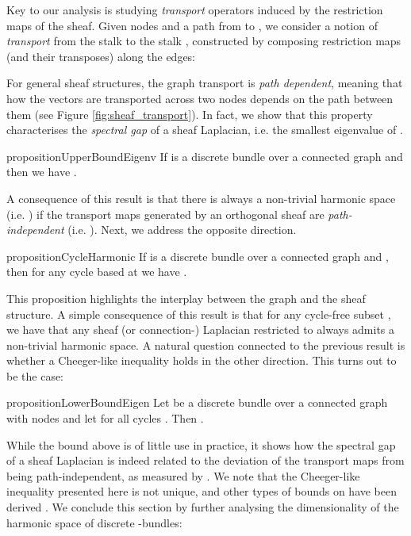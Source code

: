 \documentclass{article}
\begin{document}
Key to our analysis is studying \emph{transport} operators induced by the restriction maps of the sheaf. Given nodes  and a path  from  to , we consider a notion of \emph{transport} from the stalk  to the stalk , 
constructed by composing restriction maps (and their transposes) along the edges: \vspace{-1mm}

For general sheaf structures, the graph transport is \emph{path dependent}, meaning that how the vectors are transported across two nodes depends on the path between them (see Figure \ref{fig:sheaf_transport}). In fact, we show that this property characterises the {\em spectral gap} of a sheaf Laplacian, i.e. the smallest eigenvalue of . 
\begin{restatable}{proposition}{UpperBoundEigenv}\label{prop:upper_bound_eigenv} If  is a discrete  bundle over a connected graph and  then we have 
.
\end{restatable}
A consequence of this result is that there is always a non-trivial harmonic space (i.e. ) if the transport maps generated by an orthogonal sheaf are \emph{path-independent} (i.e. ). Next, we address the opposite direction.\begin{restatable}{proposition}{CycleHarmonic}\label{prop:cycle_harmonic}
If  is a discrete  bundle over a connected graph and , then for any cycle  based at  we have 
.
\end{restatable}


This proposition highlights the interplay between the graph and the sheaf structure. A simple consequence of this result is that for any cycle-free subset , we have that any sheaf (or connection-) Laplacian restricted to  always admits a non-trivial harmonic space. A natural question connected to the previous result is whether a Cheeger-like inequality holds in the other direction. This turns out to be the case:

\begin{restatable}{proposition}{LowerBoundEigen}\label{prop:lower_bound_eigen}
Let  be a discrete  bundle over a connected graph  with  nodes and let  for all cycles . Then 
.
\end{restatable}
While the bound above is of little use in practice, it shows how the spectral gap of a sheaf Laplacian is indeed related to the deviation of the transport maps from being path-independent, as measured by . We note that the Cheeger-like inequality presented here is not unique, and other types of bounds on  have been derived \citep{bandeira2013cheeger}.  
We conclude this section by further analysing the dimensionality of the harmonic space of discrete -bundles:
\end{document}
